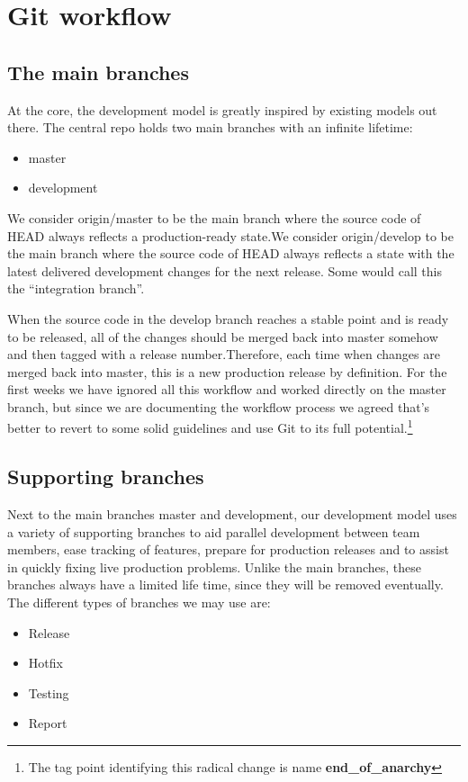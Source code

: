 \section{Git workflow}

\subsection{The main branches}

At the core, the development model is greatly inspired by existing models out
there. The central repo holds two main branches with an infinite lifetime:
\begin{itemize}[itemsep=1pt, parsep=1pt]
  \item master
  \item development
\end{itemize}

We consider origin/master to be the main branch where the source code of HEAD
always reflects a production-ready state.We consider origin/develop to be the
main branch where the source code of HEAD always reflects a state with the latest
delivered development changes for the next release. Some would call this the
“integration branch”.

When the source code in the develop branch reaches a stable point and is ready to
be released, all of the changes should be merged back into master somehow and
then tagged with a release number.Therefore, each time when changes are merged
back into master, this is a new production release by definition. For the first
weeks we have ignored all this workflow and worked directly on the master
branch, but since we are documenting the workflow process we agreed that's
better to revert to some solid guidelines and use Git to its full
potential.\footnote{The tag point identifying this radical change is name
\textbf{end\_of\_anarchy}}

\subsection{Supporting branches}

Next to the main branches master and development, our development model uses a
variety of supporting branches to aid parallel development between team members,
ease tracking of features, prepare for production releases and to assist in
quickly fixing live production problems. Unlike the main branches, these branches
always have a limited life time, since they will be removed eventually. The
different types of branches we may use are: \begin{itemize}[itemsep=1pt,
parsep=1pt]
  \item Release
  \item Hotfix
  \item Testing
  \item Report
\end{itemize}

